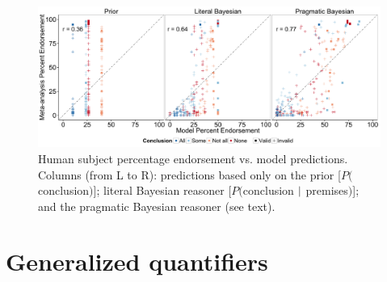 \documentclass[10pt,letterpaper]{article}
\begin{document}

\begin{figure}[t!] %
\centering
	\subfigure
		\centering
  \includegraphics[width=\textwidth]{multiScatter_fig2}
  \caption{Human subject percentage endorsement vs. model predictions.
  Columns (from L to R): predictions based only on the prior [$P($conclusion$)$]; literal Bayesian reasoner [$P($conclusion $\arrowvert$ premises$)$]; and the pragmatic Bayesian reasoner (see text).}
  \label{fig:megaScatter}

\end{figure}






\section{Generalized quantifiers}
\end{document}
